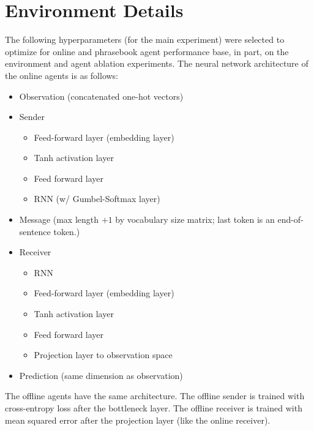 {}

\section{Environment Details}%
\label{app:env}

The following hyperparameters (for the main experiment) were selected to optimize for online and phrasebook agent performance base, in part, on the environment and agent ablation experiments.
The neural network architecture of the online agents is as follows:
\begin{itemize}[nosep]
  \item Observation (concatenated one-hot vectors)
  \item Sender
  \begin{itemize}
    \item Feed-forward layer (embedding layer)
    \item Tanh activation layer
    \item Feed forward layer
    \item RNN (w/ Gumbel-Softmax layer)
  \end{itemize}
  \item Message (max length $+1$ by vocabulary size matrix; last token is an end-of-sentence token.)
  \item Receiver
  \begin{itemize}
    \item RNN
    \item Feed-forward layer (embedding layer)
    \item Tanh activation layer
    \item Feed forward layer
    \item Projection layer to observation space
  \end{itemize}
  \item Prediction (same dimension as observation)
\end{itemize}
The offline agents have the same architecture.
The offline sender is trained with cross-entropy loss after the bottleneck layer.
The offline receiver is trained with mean squared error after the projection layer (like the online receiver).


